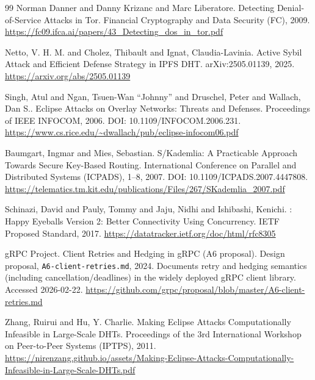 \documentclass[11pt]{article}
\begin{document}
\begin{thebibliography}{99}
Norman Danner and Danny Krizanc and Marc Liberatore.
\newblock Detecting Denial-of-Service Attacks in {Tor}.
\newblock Financial Cryptography and Data Security (FC), 2009.
\newblock \url{https://fc09.ifca.ai/papers/43_Detecting_dos_in_tor.pdf}

Netto, V. H. M. and Cholez, Thibault and Ignat, Claudia{-}Lavinia.
\newblock Active Sybil Attack and Efficient Defense Strategy in {IPFS} {DHT}.
\newblock arXiv:2505.01139, 2025.
\newblock \url{https://arxiv.org/abs/2505.01139}

Singh, Atul and Ngan, Tsuen-Wan ``Johnny'' and Druschel, Peter and Wallach, Dan S..
\newblock Eclipse Attacks on Overlay Networks: Threats and Defenses.
\newblock Proceedings of IEEE INFOCOM, 2006.
\newblock DOI: 10.1109/INFOCOM.2006.231.
\newblock \url{https://www.cs.rice.edu/~dwallach/pub/eclipse-infocom06.pdf}

Baumgart, Ingmar and Mies, Sebastian.
\newblock S/Kademlia: A Practicable Approach Towards Secure Key-Based Routing.
\newblock International Conference on Parallel and Distributed Systems (ICPADS), 1--8, 2007.
\newblock DOI: 10.1109/ICPADS.2007.4447808.
\newblock \url{https://telematics.tm.kit.edu/publications/Files/267/SKademlia_2007.pdf}

Schinazi, David and Pauly, Tommy and Jaju, Nidhi and Ishibashi, Kenichi.
: Happy Eyeballs Version 2: Better Connectivity Using Concurrency.
\newblock IETF Proposed Standard, 2017.
\newblock \url{https://datatracker.ietf.org/doc/html/rfc8305}

{gRPC Project}.
\newblock Client Retries and Hedging in gRPC (A6 proposal).
\newblock Design proposal, \texttt{A6-client-retries.md}, 2024.
\newblock Documents retry and hedging semantics (including cancellation/deadlines) in the widely deployed gRPC client library. Accessed 2026-02-22.
\newblock \url{https://github.com/grpc/proposal/blob/master/A6-client-retries.md}

Zhang, Ruirui and Hu, Y. Charlie.
\newblock Making Eclipse Attacks Computationally Infeasible in Large-Scale DHTs.
\newblock Proceedings of the 3rd International Workshop on Peer-to-Peer Systems (IPTPS), 2011.
\newblock \url{https://nirenzang.github.io/assets/Making-Eclipse-Attacks-Computationally-Infeasible-in-Large-Scale-DHTs.pdf}


\end{thebibliography}
\end{document}
